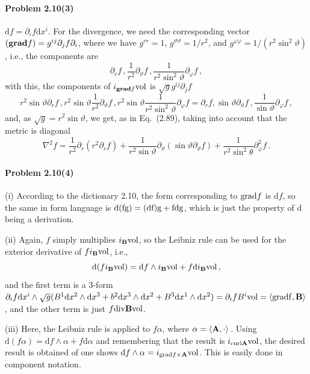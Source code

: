 \documentclass[a4paper,12pt]{article}
\def\d{\mathrm{d}}
\newcommand{\problem}[1]{\paragraph{Problem #1}}
\begin{document}

\problem{2.10(3)} $\d f = \partial_i f \d x^i$. For the divergence, we need the corresponding vector $({\bf grad} f) = g^{ij}\partial_j f \partial_i$, where we have $g^{rr}=1$, $g^{\vartheta\vartheta} = 1/r^2$, and $g^{\varphi\varphi} = 1/(r^2\sin^2\vartheta)$, i.e., the components are
\[
 \partial_r f\,,\frac{1}{r^2}\partial_\vartheta f\,, \frac{1}{r^2 \sin^2 \vartheta}\partial_\varphi f\,,
\]
with this, the components of $i_{{\bf grad}f}{\rm vol}$ is
$\sqrt{g}g^{ij}\partial_j f$
\[
 r^2\sin\vartheta \partial_r f\,, r^2 \sin\vartheta \frac{1} {r^2}\partial_\vartheta f\,, r^2 \sin \vartheta\frac{1}{r^2 \sin^2 \vartheta}\partial_\varphi f = \partial_r f, \sin\vartheta \partial_\vartheta f\,, \frac{1}{\sin\vartheta}\partial_\varphi f\,,
\]
and, as $\sqrt{g}=r^2 \sin\vartheta$, we get, as in Eq.\ (2.89), taking into account that the metric is diagonal
\[
 \nabla^2 f = \frac{1}{r^2}\partial_r(r^2\partial_r f) + \frac{1}{r^2\sin\vartheta} \partial_\vartheta (\sin\vartheta\partial_\vartheta f) + \frac{1}{r^2\sin^2\theta}\partial_\varphi^2 f\,.
\]


\problem{2.10(4)} (i) According to the dictionary 2.10, the form corresponding to ${\rm grad} f$ is $\d f$, so the same in form language is $\rm d (fg) = (\d f)g + f \d g$, which is just the property of $\d$ being a derivation.

(ii) Again, $f$ simply multiplies $i_{\bf B}{\rm vol}$, so the Leibniz rule can be used for the exterior derivative of $f i_{\bf B}{\rm vol}$, i.e.,
\[
 \d (f i_{\bf B}{\rm vol}) = \d f \wedge i_{\bf B}{\rm vol} + f \d i_{\bf B}{\rm vol}\,,
\]
and the first term is a $3$-form 
$\partial_i f \d x^i \wedge \sqrt{g}(B^1 \d x^2\wedge \d x^3 + b^2 \d x^3 \wedge \d x^2 + B^3 \d x^1 \wedge \d x^2) = \partial_i f B^i {\rm vol} = \langle {\rm grad f}, {\bf B}\rangle$, and the other term is just $f {\rm div}{\bf B}{\rm vol}$.

(iii) Here, the Leibniz rule is applied to $f \alpha$, where $\alpha = \langle {\bf A}, \cdot \rangle$\,. Using $\d (f\alpha) = \d f \wedge \alpha + f \d \alpha$ and remembering that the result is $i_{\rm curl {\bf A}}{\rm vol}$, the desired result is obtained of one shows $\d f \wedge \alpha = i_{{\rm grad} f \times {\bf A}}{\rm vol}$. This is easily done in component notation.
\end{document}
